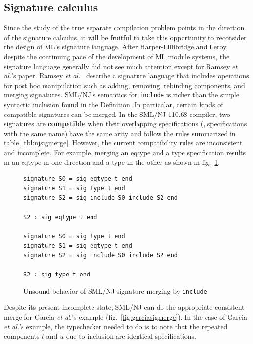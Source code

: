 \documentclass[12pt]{article}
\newcommand{\etal}{{\it et al.}}
\begin{document}
\subsection{Signature calculus}
	Since the study of the true separate compilation problem points in the direction of the signature calculus, it will be fruitful to take this opportunity to reconsider the design of ML's signature language. After Harper-Lillibridge and Leroy, despite the continuing pace of the development of ML module systems, the signature language generally did not see much attention except for Ramsey \etal's paper\cite{ramsey05}. Ramsey \etal~\cite{ramsey05} describe a signature language that includes operations for post hoc manipulation such as adding, removing, rebinding components, and merging signatures. SML/NJ's semantics for \lstinline{include} is richer than the simple syntactic inclusion found in the Definition\cite{mthm97}. In particular, certain kinds of compatible signatures can be merged. In the SML/NJ 110.68 compiler, two signatures are {\bf compatible} when their overlapping specifications (\ie, specifications with the same name) have the same arity and follow the rules summarized in table~\ref{tbl:njsigmerge}. However, the current compatibility rules are inconsistent and incomplete. For example, merging an eqtype and a type specification results in an eqtype in one direction and a type in the other as shown in fig.~\ref{fig:compatmerge}. 

\begin{figure}
\begin{lstlisting}
signature S0 = sig eqtype t end
signature S1 = sig type t end
signature S2 = sig include S0 include S2 end 

S2 : sig eqtype t end

signature S0 = sig type t end
signature S1 = sig eqtype t end
signature S2 = sig include S0 include S2 end

S2 : sig type t end	
\end{lstlisting}
\caption{Unsound behavior of SML/NJ signature merging by \lstinline{include}}
\label{fig:compatmerge}
\end{figure}
	
Despite its present incomplete state, SML/NJ can do the appropriate consistent merge for Garcia \etal's example (fig.~\ref{fig:garciasigmerge}). In the case of Garcia \etal's example, the typechecker needed to do is to note that the repeated components $t$ and $u$ due to inclusion are identical specifications. 
	
\end{document}
